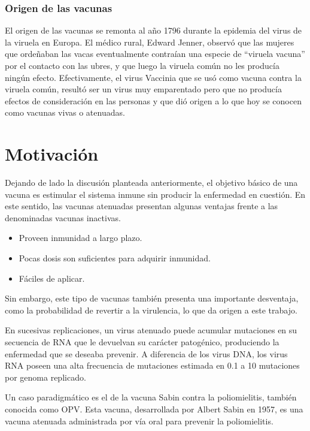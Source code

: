 \subsubsection{Origen de las vacunas}

El origen de las vacunas se remonta al a\~no 1796 durante la epidemia del virus
de la viruela en Europa. El m\'edico rural, Edward Jenner, observ\'o que las
mujeres que orde\~naban las vacas eventualmente contra\'ian una especie de
``viruela vacuna'' por el contacto con las ubres, y que luego la viruela com\'un
no les produc\'ia ning\'un efecto. Efectivamente, el virus Vaccinia que se us\'o
como vacuna contra la viruela com\'un, result\'o ser un virus muy emparentado
pero que no produc\'ia efectos de consideraci\'on en las personas y que di\'o
origen a lo que hoy se conocen como vacunas vivas o atenuadas.

\section{Motivaci\'on}
\label{motivacion}
Dejando de lado la discusi\'on planteada anteriormente, el objetivo b\'asico de
una vacuna es estimular el sistema inmune sin producir la enfermedad en
cuesti\'on. En este sentido, las vacunas atenuadas presentan algunas ventajas
frente a las denominadas vacunas inactivas.
\begin{itemize}
 \item Proveen inmunidad a largo plazo.
 \item Pocas dosis son suficientes para adquirir inmunidad. 
 \item F\'aciles de aplicar.
\end{itemize}

Sin embargo, este tipo de vacunas tambi\'en presenta una importante desventaja,
como la probabilidad de revertir a la virulencia, lo que da origen a este
trabajo.

En sucesivas replicaciones, un virus atenuado puede acumular mutaciones en su
secuencia de \ac{RNA} que le devuelvan su car\'acter patog\'enico, produciendo
la enfermedad que se deseaba prevenir. A diferencia de los virus \ac{DNA}, los
virus \ac{RNA} poseen una alta frecuencia de mutaciones estimada en 0.1 a 10
mutaciones por genoma replicado\cite{Vignuzzi08}.

Un caso paradigm\'atico es el de la vacuna Sabin contra la poliomielitis,
tambi\'en conocida como \ac{OPV}. Esta vacuna, desarrollada por Albert Sabin en
1957, es una vacuna atenuada administrada por v\'ia oral para prevenir la
poliomielitis. 

